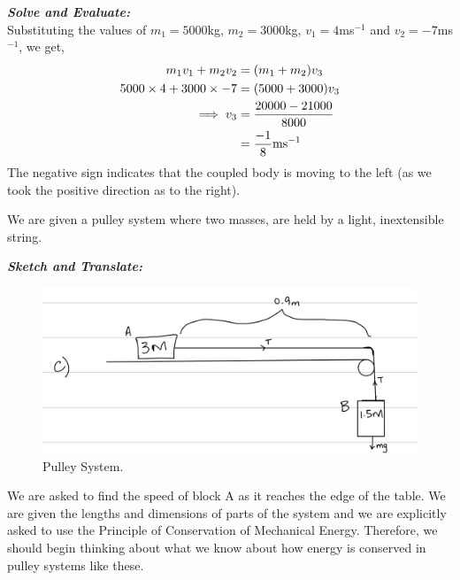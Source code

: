 \begin{subquestions}
	
	
	
\textbf{\textit{Solve and Evaluate:}} \\
Substituting the values of $m_1=5000$kg, $m_2=3000$kg, $v_1=4$ms$^{-1}$ and $v_2=-7$ms$^{-1}$, we get,
\begin{align}
	m_1v_1 + m_2v_2 & = (m_1+m_2)v_3 \nonumber \\
	5000\times4 + 3000\times-7 & = (5000+3000)v_3 \nonumber \\
	\implies v_3 & = \frac{20000-21000}{8000} \nonumber \\
	             & = \frac{-1}{8}\text{ms}^{-1}
\end{align}
The negative sign indicates that the coupled body is moving to the left (as we took the positive direction as to the right).
	

\subquestion
We are given a pulley system where two masses, are held by a light, inextensible string.

\textbf{\textit{Sketch and Translate:}} \\
\begin{figure}[H]
	\begin{center}
		\includegraphics[scale=0.25]{../2015/figures/2015q6-3}
		\caption{\label{2015:q6:fig:Sketch3} Pulley System.}
	\end{center}
\end{figure}	
We are asked to find the speed of block A as it reaches the edge of the table. We are given the lengths and dimensions of parts of the system and we are explicitly asked to use the Principle of Conservation of Mechanical Energy. Therefore, we should begin thinking about what we know about how energy is conserved in pulley systems like these.





\end{subquestions}
